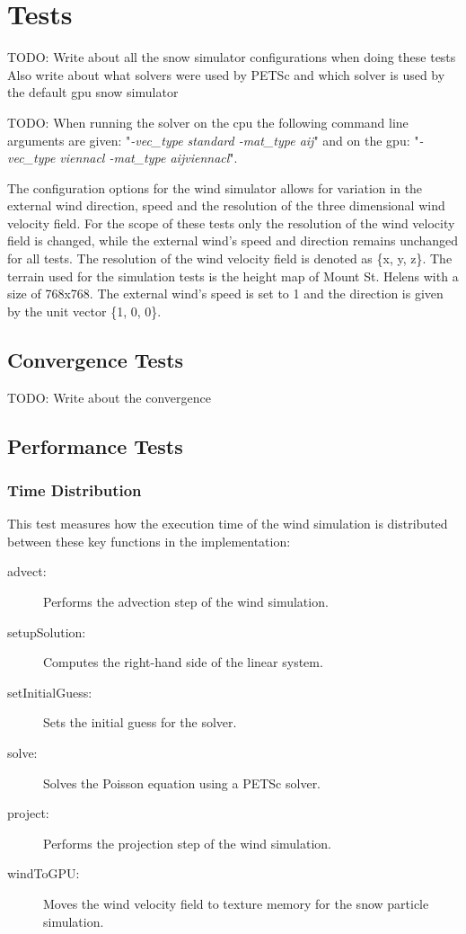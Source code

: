 \section{Tests}

TODO: Write about all the snow simulator configurations when doing these tests
Also write about what solvers were used by PETSc and which solver is used
by the default gpu snow simulator

TODO: When running the solver on the cpu the following command line arguments
are given: "\emph{-vec\_type standard -mat\_type aij}" and on the gpu:
"\emph{-vec\_type viennacl -mat\_type aijviennacl}".

The configuration options for the wind simulator allows for variation in the
external wind direction, speed and the resolution of the three dimensional wind
velocity field. For the scope of these tests only the resolution of the wind
velocity field is changed, while the external wind's speed and direction remains
unchanged for all tests. The resolution of the wind velocity field is denoted
as \{x, y, z\}. The terrain used for the simulation tests is the height map of
Mount St. Helens with a size of 768x768. The external wind's speed is set to 1
and the direction is given by the unit vector \{1, 0, 0\}.

\subsection{Convergence Tests}

TODO: Write about the convergence

\subsection{Performance Tests}

\subsubsection{Time Distribution}

This test measures how the execution time of the wind simulation is distributed
between these key functions in the implementation:
\begin{description}
	\item[advect:] Performs the advection step of the wind simulation.
	\item[setupSolution:] Computes the right-hand side of the linear system.
	\item[setInitialGuess:] Sets the initial guess for the solver.
	\item[solve:] Solves the Poisson equation using a PETSc solver.
	\item[project:] Performs the projection step of the wind simulation.
	\item[windToGPU:] Moves the wind velocity field to texture memory for the
	snow particle simulation.
\end{description}

